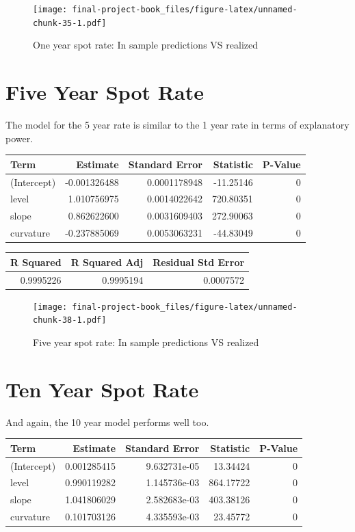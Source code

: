 \documentclass[]{book}
\theoremstyle{definition}
\theoremstyle{definition}
\theoremstyle{definition}
\theoremstyle{remark}
\begin{document}
\begin{figure}
\centering
\texttt{[image: final-project-book\_files/figure-latex/unnamed-chunk-35-1.pdf]}
\caption{\label{fig:unnamed-chunk-35}One year spot rate: In sample
predictions VS realized}
\end{figure}

\hypertarget{five-year-spot-rate}{%
\section{Five Year Spot Rate}\label{five-year-spot-rate}}

The model for the 5 year rate is similar to the 1 year rate in terms of
explanatory power.

\begin{tabular}{l|r|r|r|r}
\hline
Term & Estimate & Standard Error & Statistic & P-Value\\
\hline
(Intercept) & -0.001326488 & 0.0001178948 & -11.25146 & 0\\
\hline
level & 1.010756975 & 0.0014022642 & 720.80351 & 0\\
\hline
slope & 0.862622600 & 0.0031609403 & 272.90063 & 0\\
\hline
curvature & -0.237885069 & 0.0053063231 & -44.83049 & 0\\
\hline
\end{tabular}

\begin{tabular}{r|r|r}
\hline
R Squared & R Squared Adj & Residual Std Error\\
\hline
0.9995226 & 0.9995194 & 0.0007572\\
\hline
\end{tabular}

\begin{figure}
\centering
\texttt{[image: final-project-book\_files/figure-latex/unnamed-chunk-38-1.pdf]}
\caption{\label{fig:unnamed-chunk-38}Five year spot rate: In sample
predictions VS realized}
\end{figure}

\hypertarget{ten-year-spot-rate}{%
\section{Ten Year Spot Rate}\label{ten-year-spot-rate}}

And again, the 10 year model performs well too.

\begin{tabular}{l|r|r|r|r}
\hline
Term & Estimate & Standard Error & Statistic & P-Value\\
\hline
(Intercept) & 0.001285415 & 9.632731e-05 & 13.34424 & 0\\
\hline
level & 0.990119282 & 1.145736e-03 & 864.17722 & 0\\
\hline
slope & 1.041806029 & 2.582683e-03 & 403.38126 & 0\\
\hline
curvature & 0.101703126 & 4.335593e-03 & 23.45772 & 0\\
\hline
\end{tabular}
\end{document}
